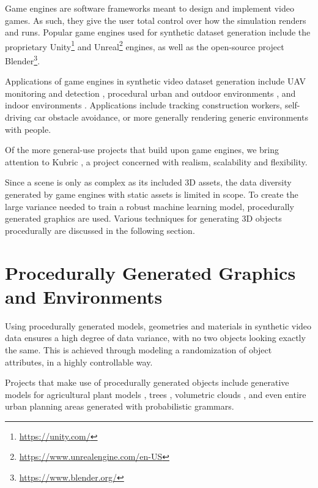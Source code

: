 Game engines are software frameworks meant to design and implement video games. As such, they give the user total control over how the simulation renders and runs. Popular game engines used for synthetic dataset generation include the proprietary Unity\footnote{\url{https://unity.com/}} and Unreal\footnote{\url{https://www.unrealengine.com/en-US}} engines, as well as the open-source project Blender\footnote{\url{https://www.blender.org/}}.

Applications of game engines in synthetic video dataset generation include UAV monitoring and detection \cite{barisic2022sim2air}, procedural urban and outdoor environments \cite{ros2016synthia,khan2019procsy,stein2018genesis}, and indoor environments \cite{martinez2021unrealrox+}. Applications include tracking construction workers\cite{neuhausen2020using}, self-driving car obstacle avoidance\cite{bhandari2018procedural,pouyanfar2019roads}, or more generally rendering generic environments with people\cite{kerim2021nova}.

Of the more general-use projects that build upon game engines, we bring attention to Kubric \cite{greff2021kubric}, a project concerned with realism, scalability and flexibility.

Since a scene is only as complex as its included 3D assets, the data diversity generated by game engines with static assets is limited in scope. To create the large variance needed to train a robust machine learning model, procedurally generated graphics are used. Various techniques for generating 3D objects procedurally are discussed in the following section.

\section{Procedurally Generated Graphics and Environments}
\label{sec:procedurally-generated}

Using procedurally generated models, geometries and materials in synthetic video data ensures a high degree of data variance, with no two objects looking exactly the same. This is achieved through modeling a randomization of object attributes, in a highly controllable way.

Projects that make use of procedurally generated objects include generative models for agricultural plant models \cite{di2017automatic,barth2018data}, trees \cite{hewitt2017proceduralTrees}, volumetric clouds \cite{bengtsson2022efficient}, and even entire urban planning areas generated with probabilistic grammars\cite{kar2019meta}.

